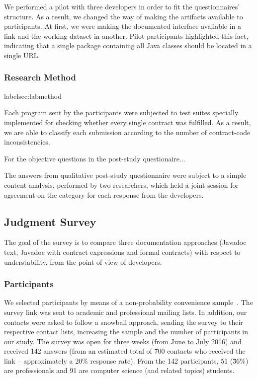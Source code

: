 We performed a pilot with three developers in order to fit the questionnaires' structure.
As a result, we changed the way of making the artifacts available to participants. 
At first, we were making the documented interface available in a link and the working dataset in another. 
Pilot participants highlighted this fact, indicating that a single package containing all Java classes should be located in a single URL.

\subsubsection{Research Method}
label{sec:labmethod}

Each program sent by the participants were subjected to test suites specially implemented for checking whether every single contract was fulfilled.
As a result, we are able to classify each submission according to the number of contract-code inconsistencies.

For the objective questions in the post-study questionaire...

The answers from qualitative post-study questionnaire were subject to a simple content analysis, performed by two researchers, which held a joint session for agreement on the category for each response from the developers.


\subsection{Judgment Survey}
\label{sec:survey}

The goal of the survey is to compare three documentation approaches (Javadoc text, Javadoc with contract expressions and formal contracts) with respect to understability, from the point of view of developers. 

\subsubsection{Participants}
\label{sec:surveyPart}

We selected participants by means of a non-probability  convenience sample~\cite{wohlin}. 
The survey link was sent to academic and professional mailing lists.
In addition, our contacts were asked to follow a snowball approach, sending the survey to their respective
contact lists, increasing the sample and the number of participants in our study.
The survey was open for three weeks (from June to July 2016) and received 142
answers (from an estimated total of 700 contacts who received the link -- approximately a 20\% response
rate). From the 142 participants, 51 (\~36\%) are professionals and 91 are computer science (and related topics) students.


